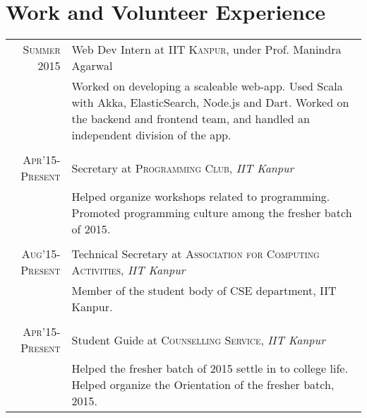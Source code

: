 \documentclass[11pt,a4paper]{article}
\begin{document}
\section*{Work and Volunteer Experience}
\begin{tabular}{r|p{11cm}}
\textsc{Summer 2015} & Web Dev Intern at \textsc{IIT Kanpur}, under Prof. Manindra Agarwal\\
&\footnotesize{Worked on developing a scaleable web-app. \newline Used Scala with Akka, ElasticSearch, Node.js and Dart. \newline Worked on the backend and frontend team, and handled an independent division of the app.}\\\multicolumn{2}{c}{} \\

\textsc{Apr'15-Present} & Secretary at \textsc{Programming Club}, \emph{IIT Kanpur}\\
&\footnotesize{Helped organize workshops related to programming. \newline Promoted programming culture among the fresher batch of 2015.}\\\multicolumn{2}{c}{} \\

\textsc{Aug'15-Present} & Technical Secretary at \textsc{\newline Association for Computing Activities}, \emph{IIT Kanpur}\\
&\footnotesize{Member of the student body of CSE department, IIT Kanpur.}\\\multicolumn{2}{c}{} \\

\textsc{Apr'15-Present} & Student Guide at \textsc{Counselling Service}, \emph{IIT Kanpur}\\
&\footnotesize{Helped the fresher batch of 2015 settle in to college life. \newline Helped organize the Orientation of the fresher batch, 2015.}

\end{tabular}

\vspace{5mm}
\end{document}
